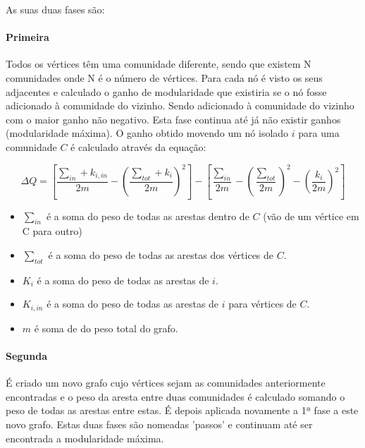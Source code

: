 As suas duas fases são:

\paragraph{Primeira}
Todos os vértices têm uma comunidade diferente, sendo que existem N comunidades onde N é o número de vértices.
Para cada nó é visto os seus adjacentes e calculado o ganho de modularidade que existiria se o nó fosse adicionado à comunidade do vizinho. Sendo adicionado à comunidade do vizinho com o maior ganho não negativo. Esta fase continua até já não existir ganhos (modularidade máxima).
O ganho obtido movendo um nó isolado $i$ para uma comunidade $C$ é calculado através da equação:


\begin{equation}
\label{eq:GND}
 \Delta Q  =  [\frac{\sum_{in} + k_{i,in}}{2m} - (\frac{\sum_{tot} +k_i}{2m})^2] - [\frac{\sum_{in}}{2m} - (\frac{\sum_{tot}}{2m})^2 - (\frac{k_i}{2m})^2] 
\end{equation}

\begin{itemize}
	\item $\sum_{in}$ é a soma do peso de todas as arestas dentro de $C$ (vão de um vértice em C para outro)
	\item $\sum_{tot}$ é a soma do peso de todas as arestas dos vértices de $C$. %
	\item $K_i$ é a soma do peso de todas as arestas de $i$. %
	\item $K_{i,in}$ é a soma do peso de todas as arestas de $i$ para vértices de $C$.
	\item $m$ é soma de do peso total do grafo.
\end{itemize}

\paragraph{Segunda}
É criado um novo grafo cujo vértices sejam as comunidades anteriormente encontradas e o peso da aresta entre duas comunidades é calculado somando o peso de todas as arestas entre estas. É depois aplicada novamente a 1ª fase a este novo grafo.
Estas duas fases são nomeadas 'passos' e continuam até ser encontrada a modularidade máxima.


